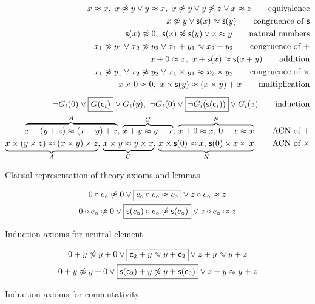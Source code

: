 \begin{table}[hbt]	
	\begin{align*}
	x\mEQ x,\ 
	x\mNE y\lor y\mEQ x,\ 
	x\mNE y\lor y\mNE z\lor x\mEQ z
	\tag*{equivalence}
	\\
	x\mNE y\lor \msucc(x)\mEQ\msucc(y) 
	\tag*{congruence of $\msucc$}
	\\
	\msucc(x) \mNE 0,\ 
	\msucc(x) \mNE \msucc(y) \lor x \mEQ y
	\tag*{natural numbers}
	\\
	x_1\mNE y_1\lor x_2\mNE y_2\lor x_1+y_1 \mEQ x_2+y_2
	\tag*{congruence of $+$}
	\\
	x + 0 \mEQ x,\ 
	x+\msucc(x) \mEQ \msucc(x+y)
	\tag*{addition}
	\\
	x_1\mNE y_1\lor x_2\mNE y_2\lor x_1\times y_1 \mEQ x_2\times y_2
	\tag*{congruence of $\times$}
	\\
	x \times 0 \mEQ 0,\ 
	x \times\msucc(y) \mEQ (x\times y) + x
	\tag*{multiplication}
	\\[0.5em]
	\lnot G_i(0) \lor \boxed{G(\mc_i)} \lor G_i(y),\ 
	\lnot G_i(0) \lor \boxed{\lnot G_i(\msucc(\mc_i))} \lor G_i(z)
	\tag*{induction}
	\\
	\overbrace{x+ (y+ z) \mEQ (x+ y) + z}^{A},\,
	\overbrace{x+ y \mEQ y+ x}^{C},\, 
	\overbrace{x+ 0 \mEQ x,\, 0+ x\mEQ x}^N
	\tag*{ACN of $+$}
	\\
	\underbrace{x\times (y\times z) \mEQ (x\times y) \times z}_A,\,
	\underbrace{x\times y \mEQ y\times x}_C,\, 
	\underbrace{x\times \msucc(0) \mEQ x,\, \msucc(0)\times x\mEQ x}_N
	\tag*{ACN of $\times$}
	\end{align*}
	\caption{Clausal representation of theory axioms and lemmas}
	\label{tab:presburger:axioms:clauses}
\end{table}

\begin{table}[hbt]	
	\begin{gather*}
	0\circ e_\circ\not\approx 0
	\lor\boxed{
		c_\circ \circ e_\circ \approx c_\circ
	}
	\lor z\circ e_\circ \approx z
	\\
	0\circ e_\circ\not\approx 0
	\lor\boxed{
		{\mathsf s}(c_\circ) \circ e_\circ \not\approx {\mathsf s}(c_\circ)
	}
	\lor z\circ e_\circ \approx z
	\end{gather*}
	\caption{Induction axioms for neutral element}
	\label{tab:presburger:induction:clauses}
\end{table}

\begin{table}[hbt]	
	\begin{gather*}
	{0+y\not\approx y+0} 
	\lor\boxed{{\mathsf c}_2+y\approx y+{\mathsf c}_2} 
	\lor{z+y\approx y+z} 
	\\
	0+y\not\approx y+0 \lor 
	\boxed{{\mathsf s}({\mathsf c}_2)+y\not\approx y+{\mathsf s}({\mathsf c}_2)} 
	\lor z+y\approx y+z
	\end{gather*}
	\caption{Induction axioms for commutativity}
	\label{tab:presburger:induction:commutativity}
\end{table}


